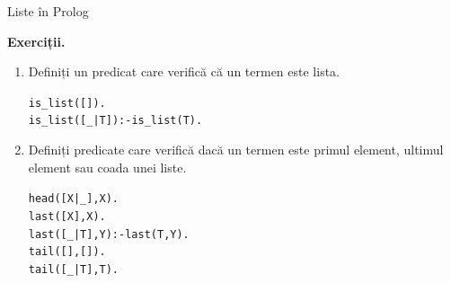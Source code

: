 \documentclass[xcolor=pdftex,romanian,colorlinks]{beamer}
\begin{document}
%
%
%

\begin{frame}{Liste în Prolog}


\textbf{\color{True} Exerciții.}

\begin{enumerate}
\item  Definiți un predicat care verifică că un termen este lista.

 \pause
\begin{alltt}
is\_list([]).\\
is\_list([\_ | T]) :- is\_list(T).
\end{alltt}
 
\pause \vspace{.2cm}
\item Definiți predicate care verifică dacă un termen este primul element, ultimul element sau coada unei liste.

\pause
\begin{alltt}
head([X|\_],X). \\

last([X],X). \\
last([\_|T],Y):- last(T,Y).\\
 
tail([],[]).\\
tail([\_|T],T).
\end{alltt}
\end{enumerate}
\end{frame}
\end{document}
